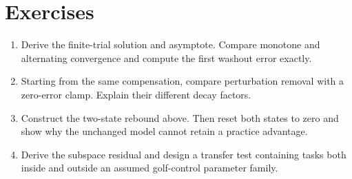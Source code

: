 \section*{Exercises}
\begin{enumerate}
 \item Derive the finite-trial solution and asymptote. Compare monotone and
 alternating convergence and compute the first washout error exactly.
 \item Starting from the same compensation, compare perturbation removal
 with a zero-error clamp. Explain their different decay factors.
 \item Construct the two-state rebound above. Then reset both states to zero
 and show why the unchanged model cannot retain a practice advantage.
 \item Derive the subspace residual and design a transfer test containing
 tasks both inside and outside an assumed golf-control parameter family.
\end{enumerate}
